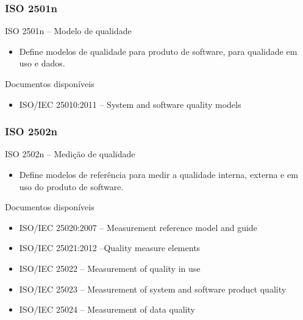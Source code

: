 \begin{frame}
	\frametitle{ISO 2501n}

	\begin{block:concept}{ISO 2501n -- Modelo de qualidade}
		\begin{itemize}
			\item Define modelos de qualidade para produto de software, para qualidade
			em uso e dados.
		\end{itemize}
	\end{block:concept}

	\begin{block:fact}{Documentos disponíveis}
		\begin{itemize}
			\item ISO/IEC 25010:2011 -- System and software quality models
		\end{itemize} 
	\end{block:fact}

	\note{
	}
\end{frame}


\begin{frame}
	\frametitle{ISO 2502n}

	\begin{block:concept}{ISO 2502n -- Medição de qualidade}
		\begin{itemize}
			\item Define modelos de referência para medir a qualidade interna, externa
			e em uso do produto de software.
		\end{itemize}
	\end{block:concept}
	
	\begin{block:fact}{Documentos disponíveis}
		\begin{itemize}
			\item ISO/IEC 25020:2007 -- Measurement reference model and guide
			\item ISO/IEC 25021:2012 --Quality measure elements
			\item ISO/IEC 25022 -- Measurement of quality in use
			\item ISO/IEC 25023 -- Measurement of system and software product quality
			\item ISO/IEC 25024 -- Measurement of data quality
		\end{itemize} 
	\end{block:fact}

\end{frame}



